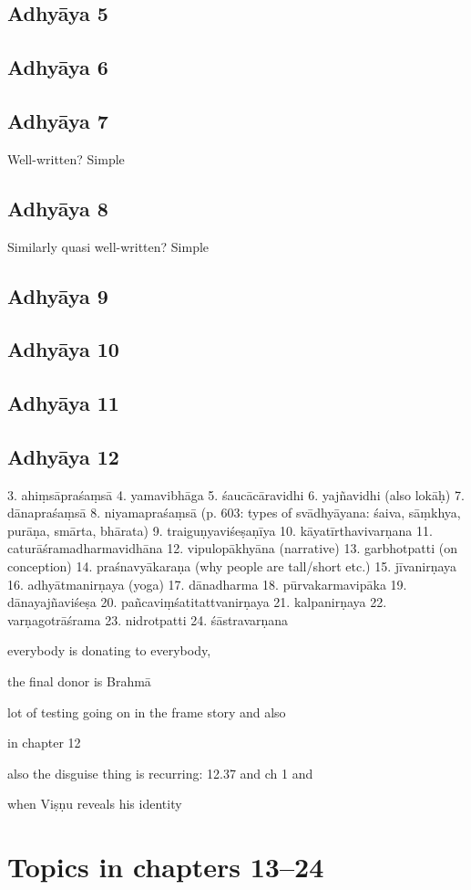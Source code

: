 \subsection{Adhyāya 5}\label{contents_of_ch05}
\subsection{Adhyāya 6}\label{contents_of_ch06}
\subsection{Adhyāya 7}\label{contents_of_ch07}
Well-written? Simple

\subsection{Adhyāya 8}\label{contents_of_ch08}
Similarly quasi well-written? Simple
\subsection{Adhyāya 9}\label{contents_of_ch09}
\subsection{Adhyāya 10}\label{contents_of_ch10}
\label{no_pingala}

\subsection{Adhyāya 11}\label{contents_of_ch11}
\subsection{Adhyāya 12}\label{contents_of_ch12}

  3. ahiṃsāpraśaṃsā 
  4. yamavibhāga
  5. śaucācāravidhi
  6. yajñavidhi (also lokāḥ)
  7. dānapraśaṃsā 
  8. niyamapraśaṃsā (p. 603: types of svādhyāyana: śaiva, sāṃkhya, purāṇa,
                    smārta, bhārata)
  9. traiguṇyaviśeṣaṇīya
  10. kāyatīrthavivarṇana
  11. caturāśramadharmavidhāna 
  12. vipulopākhyāna  (narrative)
  13. garbhotpatti (on conception)
  14. praśnavyākaraṇa (why people are tall/short etc.)
  15. jīvanirṇaya 
  16. adhyātmanirṇaya (yoga) 
  17. dānadharma
  18. pūrvakarmavipāka
  19. dānayajñaviśeṣa
  20. pañcaviṃśatitattvanirṇaya
  21. kalpanirṇaya
  22. varṇagotrāśrama
  23. nidrotpatti
  24. śāstravarṇana


    everybody is donating to everybody,
  
    the final donor is Brahmā
  
    lot of testing going on in the frame story and also
  
    in chapter 12
  
    also the disguise thing is recurring: 12.37 and ch 1 and
  
    when Viṣṇu reveals his identity
    

\section{Topics in chapters 13--24}\label{contentsof12_24}

\vfill
\pagebreak
